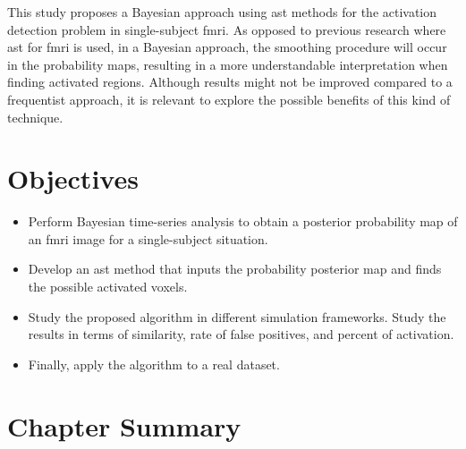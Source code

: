 This study proposes a Bayesian approach using \gls{ast} methods for the activation detection problem in single-subject \gls{fmri}. As opposed to previous research where \gls{ast} for \gls{fmri} is used, in a Bayesian approach, the smoothing procedure will occur in the probability maps, resulting in a more understandable interpretation when finding activated regions. Although results might not be improved compared to a frequentist approach, it is relevant to explore the possible benefits of this kind of technique. 

\section{Objectives}

\begin{itemize}
\item Perform Bayesian time-series analysis to obtain a posterior probability map of an \gls{fmri} image for a single-subject situation.
\item Develop an \gls{ast} method that inputs the probability posterior map and finds the possible activated voxels.
\item Study the proposed algorithm in different simulation frameworks. Study the results in terms of similarity, rate of false positives, and percent of activation.
\item Finally, apply the algorithm to a real dataset.
\end{itemize}

\section{Chapter Summary}

